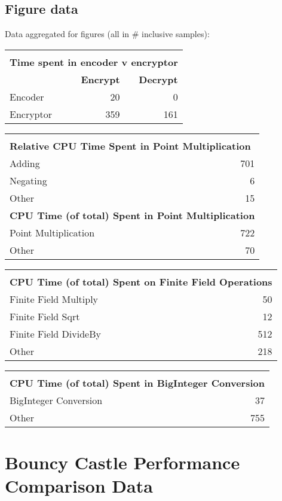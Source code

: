 \subsection{Figure data}

Data aggregated for figures (all in \# inclusive samples):

\begin{tabular}{|l|r|r|}
	\hline
    \multicolumn{3}{|l|}{} \\
	\multicolumn{3}{|l|}{\textbf{Time spent in encoder v encryptor}} \\
    \hline
	& \textbf{Encrypt} & \textbf{Decrypt} \\
	Encoder & 20 & 0 \\
	Encryptor & 359 & 161 \\
	\hline
\end{tabular}

\begin{tabular}{|l|r|}
	\hline
    \multicolumn{2}{|l|}{} \\
	\multicolumn{2}{|l|}{\textbf{Relative CPU Time Spent in Point Multiplication}} \\
    \hline
	Adding & 701 \\
	Negating & 6 \\
	Other & 15 \\
	\hline
	\multicolumn{2}{|l|}{\textbf{CPU Time (of total) Spent in Point Multiplication}} \\
	Point Multiplication & 722 \\
	Other & 70 \\
	\hline
\end{tabular}

\begin{tabular}{|l|r|}
	\hline
    \multicolumn{2}{|l|}{} \\
	\multicolumn{2}{|l|}{\textbf{CPU Time (of total) Spent on Finite Field Operations}} \\
    \hline
	Finite Field Multiply & 50 \\
	Finite Field Sqrt & 12 \\
	Finite Field DivideBy & 512 \\
	Other & 218 \\
	\hline
\end{tabular}

\begin{tabular}{|l|r|}
	\hline
    \multicolumn{2}{|l|}{} \\
	\multicolumn{2}{|l|}{\textbf{CPU Time (of total) Spent in BigInteger Conversion}} \\
    \hline
	BigInteger Conversion & 37 \\
	Other & 755 \\
	\hline
\end{tabular}

\section{Bouncy Castle Performance Comparison Data}
\label{app:bc-performance-data}